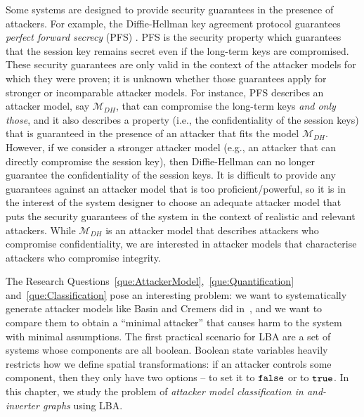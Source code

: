     

\label{sec:Classification:ClassificationProblem}
Some systems are designed to provide security guarantees in the presence of attackers. For example, the Diffie-Hellman key agreement protocol guarantees \emph{perfect forward secrecy} (PFS) \cite{Gunther1990,Menezes1996}. PFS is the security property which guarantees that the session key remains secret even if the long-term keys are compromised. These security guarantees are only valid in the context of the attacker models for which they were proven; it is unknown whether those guarantees apply for stronger or incomparable attacker models. For instance, PFS describes an attacker model, say $\mathcal{M}_{DH}$, that can compromise the long-term keys \emph{and only those}, and it also describes a property (i.e., the confidentiality of the session keys) that is guaranteed in the presence of an attacker that fits the model $\mathcal{M}_{DH}$. However, if we consider a stronger attacker model (e.g., an attacker that can directly compromise the session key), then Diffie-Hellman can no longer guarantee the confidentiality of the session keys. It is difficult to provide any guarantees against an attacker model that is too proficient/powerful, so it is in the interest of the system designer to choose an adequate attacker model that puts the security guarantees of the system in the context of realistic and relevant attackers. While $\mathcal{M}_{DH}$ is an attacker model that describes attackers who compromise confidentiality, we are interested in attacker models that characterise attackers who compromise integrity. 

The Research Questions~\ref{que:AttackerModel},~\ref{que:Quantification} and~\ref{que:Classification} pose an interesting problem: we want to systematically generate attacker models like Basin and Cremers did in~\cite{KnowYourEnemy}, and we want to compare them to obtain a ``minimal attacker'' that causes harm to the system with minimal assumptions. The first practical scenario for LBA are a set of systems whose components are all boolean. Boolean state variables heavily restricts how we define spatial transformations: if an attacker controls some component, then they only have two options -- to set it to $\mathtt{\texttt{false}}$ or to $\mathtt{\texttt{true}}$. In this chapter, we study the problem of \emph{attacker model classification in and-inverter graphs} using LBA.

